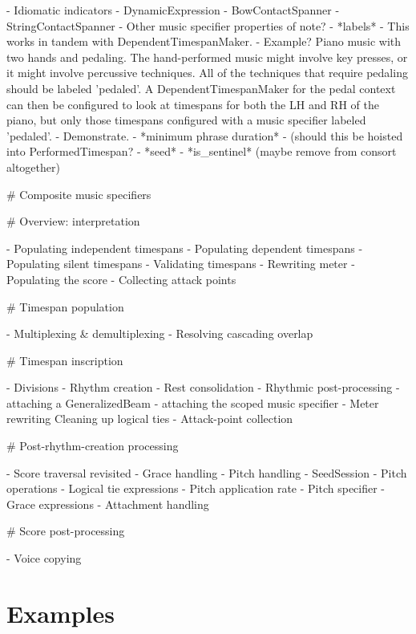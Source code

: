 \begin{markdown}
        -   Idiomatic indicators
        -   DynamicExpression
        -   BowContactSpanner
        -   StringContactSpanner
-   Other music specifier properties of note?
    -   *labels*
        -   This works in tandem with DependentTimespanMaker.
        -   Example? Piano music with two hands and pedaling. The
            hand-performed music might involve key presses, or it might involve
            percussive techniques. All of the techniques that require pedaling
            should be labeled 'pedaled'. A DependentTimespanMaker for the pedal
            context can then be configured to look at timespans for both the LH
            and RH of the piano, but only those timespans configured with a
            music specifier labeled 'pedaled'.
        -   Demonstrate.
    -   *minimum phrase duration*
        -   (should this be hoisted into PerformedTimespan?
    -   *seed*
    -   *is_sentinel* (maybe remove from consort altogether)

# Composite music specifiers

# Overview: interpretation

-   Populating independent timespans
-   Populating dependent timespans
-   Populating silent timespans
-   Validating timespans
-   Rewriting meter
-   Populating the score
-   Collecting attack points

# Timespan population

-   Multiplexing & demultiplexing
-   Resolving cascading overlap

# Timespan inscription

-   Divisions
-   Rhythm creation
-   Rest consolidation
-   Rhythmic post-processing
    -   attaching a GeneralizedBeam
    -   attaching the scoped music specifier
-   Meter rewriting
    Cleaning up logical ties
-   Attack-point collection

# Post-rhythm-creation processing

-   Score traversal revisited
-   Grace handling
-   Pitch handling
    -   SeedSession
    -   Pitch operations
    -   Logical tie expressions
    -   Pitch application rate
    -   Pitch specifier
    -   Grace expressions
-   Attachment handling

# Score post-processing

-   Voice copying

\end{markdown}

\section{Examples}

